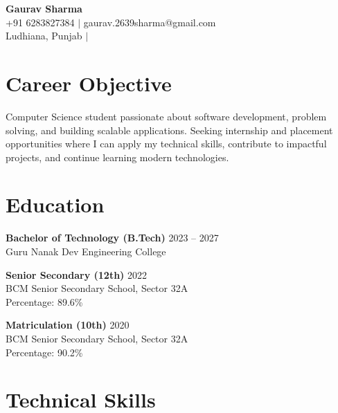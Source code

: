 \documentclass[a4paper,11pt]{article}
\begin{document}
\begin{center}
    {\LARGE \textbf{Gaurav Sharma}}\\[5pt]
    +91 6283827384 $|$ gaurav.2639sharma@gmail.com\\
    Ludhiana, Punjab $|$

\end{center}

\vspace{0.1cm}

\section*{Career Objective}
Computer Science student passionate about software development,
problem solving, and building scalable applications. Seeking
internship and placement opportunities where I can apply my
technical skills, contribute to impactful projects, and continue
learning modern technologies.

\section*{Education}

\textbf{Bachelor of Technology (B.Tech)} \hfill 2023 -- 2027\\
Guru Nanak Dev Engineering College

\vspace{0.15cm}

\textbf{Senior Secondary (12th)} \hfill 2022\\
BCM Senior Secondary School, Sector 32A\\
Percentage: 89.6\%

\vspace{0.15cm}

\textbf{Matriculation (10th)} \hfill 2020\\
BCM Senior Secondary School, Sector 32A\\
Percentage: 90.2\%

\section*{Technical Skills}
\end{document}
